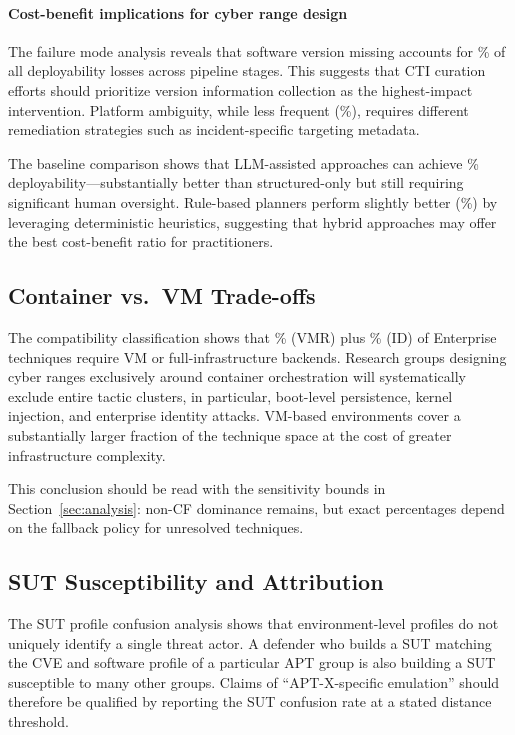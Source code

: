 \documentclass[sigconf,anonymous,review]{acmart}
\begin{document}
\paragraph{Cost-benefit implications for cyber range design}

The failure mode analysis reveals that software version missing accounts for \failureversionpercentage\% of all deployability losses across pipeline stages. This suggests that CTI curation efforts should prioritize version information collection as the highest-impact intervention. Platform ambiguity, while less frequent (\failureplatformpercentage\%), requires different remediation strategies such as incident-specific targeting metadata.

The baseline comparison shows that LLM-assisted approaches can achieve \basellmscore\% deployability—substantially better than structured-only but still requiring significant human oversight. Rule-based planners perform slightly better (\baserulescore\%) by leveraging deterministic heuristics, suggesting that hybrid approaches may offer the best cost-benefit ratio for practitioners.

\subsection{Container vs.\ VM Trade-offs}

The compatibility classification shows that \compatibilityvmrequiredpercentage\% (VMR) plus \compatibilityinfrastructuredependentpercentage\% (ID) of Enterprise techniques require VM or full-infrastructure backends. Research groups designing cyber ranges exclusively around container orchestration will systematically exclude entire tactic clusters, in particular, boot-level persistence, kernel injection, and enterprise identity attacks. VM-based environments cover a substantially larger fraction of the technique space at the cost of greater infrastructure complexity.

This conclusion should be read with the sensitivity bounds in Section~\ref{sec:analysis}: non-CF dominance remains, but exact percentages depend on the fallback policy for unresolved techniques.

\subsection{SUT Susceptibility and Attribution}

The SUT profile confusion analysis shows that environment-level profiles do not uniquely identify a single threat actor. A defender who builds a SUT matching the CVE and software profile of a particular APT group is also building a SUT susceptible to many other groups. Claims of ``APT-X-specific emulation'' should therefore be qualified by reporting the SUT confusion rate at a stated distance threshold.
\end{document}
